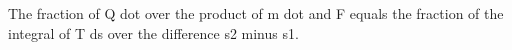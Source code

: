 The fraction of Q dot over the product of m dot and F equals the fraction of the integral of T ds over the difference s2 minus s1.